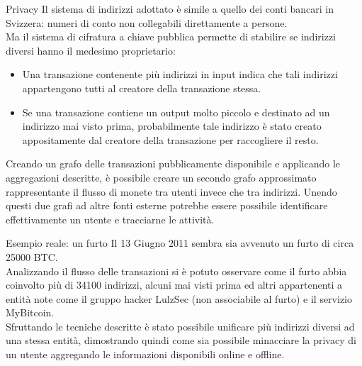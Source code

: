 \documentclass[italian]{beamer}
\begin{document}
\begin{frame}{Privacy} %
Il sistema di indirizzi adottato è simile a quello dei conti bancari in Svizzera: numeri di conto non collegabili direttamente a persone.\\
Ma il sistema di cifratura a chiave pubblica permette di stabilire se indirizzi diversi hanno il medesimo proprietario:
\begin{itemize}
 \item Una transazione contenente più indirizzi in input indica che tali indirizzi appartengono tutti al creatore della transazione stessa.
 \item Se una transazione contiene un output molto piccolo e destinato ad un indirizzo mai visto prima, probabilmente tale indirizzo è stato creato appositamente dal creatore della transazione per raccogliere il resto.
\end{itemize}
Creando un grafo delle transazioni pubblicamente disponibile e applicando le aggregazioni descritte, è possibile creare un secondo grafo approssimato rappresentante il flusso di monete tra utenti invece che tra indirizzi. Unendo questi due grafi ad altre fonti esterne potrebbe essere possibile identificare effettivamente un utente e tracciarne le attività.
\end{frame}

\begin{frame}{Esempio reale: un furto} %
Il 13 Giugno 2011 sembra sia avvenuto un furto di circa 25000 BTC.\\
Analizzando il flusso delle transazioni si è potuto osservare come il furto abbia coinvolto più di 34100 indirizzi, alcuni mai visti prima ed altri appartenenti a entità note come il gruppo hacker LulzSec (non associabile al furto) e il servizio MyBitcoin.\\
Sfruttando le tecniche descritte è stato possibile unificare più indirizzi diversi ad una stessa entità, dimostrando quindi come sia possibile minacciare la privacy di un utente aggregando le informazioni disponibili online e offline.
\end{frame}

\end{document}
